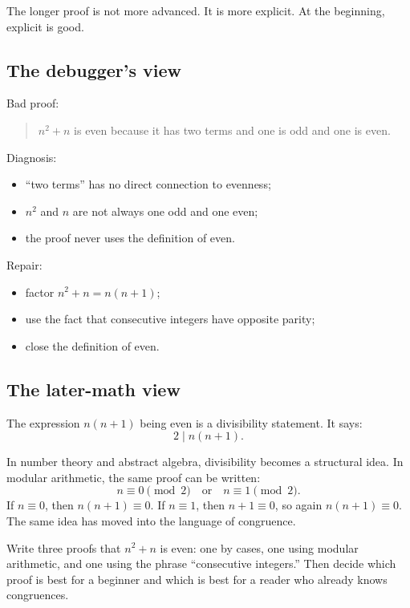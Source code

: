 \documentclass[12pt]{article}
\begin{document}
The longer proof is not more advanced. It is more explicit. At the beginning, explicit is good.

\subsection{The debugger's view}

Bad proof:

\begin{quote}
$n^2+n$ is even because it has two terms and one is odd and one is even.
\end{quote}

Diagnosis:

\begin{itemize}
\item ``two terms'' has no direct connection to evenness;
\item $n^2$ and $n$ are not always one odd and one even;
\item the proof never uses the definition of even.
\end{itemize}

Repair:

\begin{itemize}
\item factor $n^2+n=n(n+1)$;
\item use the fact that consecutive integers have opposite parity;
\item close the definition of even.
\end{itemize}

\subsection{The later-math view}

The expression $n(n+1)$ being even is a divisibility statement. It says:
\[
2\mid n(n+1).
\]

In number theory and abstract algebra, divisibility becomes a structural idea. In modular arithmetic, the same proof can be written:
\[
n\equiv0\pmod2\quad\text{or}\quad n\equiv1\pmod2.
\]
If $n\equiv0$, then $n(n+1)\equiv0$. If $n\equiv1$, then $n+1\equiv0$, so again $n(n+1)\equiv0$. The same idea has moved into the language of congruence.

\begin{labbox}
Write three proofs that $n^2+n$ is even: one by cases, one using modular arithmetic, and one using the phrase ``consecutive integers.'' Then decide which proof is best for a beginner and which is best for a reader who already knows congruences.
\end{labbox}
\end{document}
